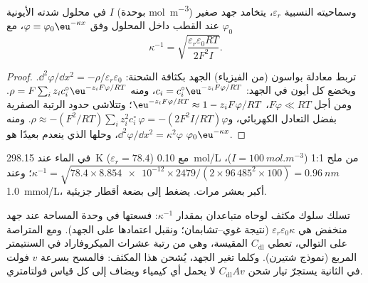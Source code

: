 \begin{proposition}\label{prop:b3:electrode-kinetics:debye-length}
في محلول شدته الأيونية $I$ (بوحدة \unit{mol.m^{-3}}) وسماحيته النسبية
$\varepsilon_r$، يتخامد جهد صغير $\varphi_0$ عند القطب داخل المحلول وفق
$\varphi = \varphi_0\eu^{-\kappa x}$، مع
\[
  \kappa^{-1} = \sqrt{\frac{\varepsilon_r\varepsilon_0RT}{2F^2I}} .
\]
\end{proposition}

\begin{proof}
تربط معادلة بواسون (من الفيزياء) الجهد بكثافة الشحنة:
$\dd^2\varphi/\dd x^2 = -\rho/\varepsilon_r\varepsilon_0$. ويخضع كل أيون  في
الجهد: $c_i = c_i^{\circ}\eu^{-z_iF\varphi/RT}$، ومنه $\rho = F\sum_iz_ic_i^{\circ}\eu^{-z_iF\varphi/RT}$. ومن أجل $F\varphi \ll RT$،
$\eu^{-z_iF\varphi/RT} \approx 1 - z_iF\varphi/RT$؛ وتتلاشى حدود الرتبة الصفرية بفضل التعادل الكهربائي،
و$\rho \approx -(F^2/RT)\sum_iz_i^2c_i^{\circ}\,\varphi = -(2F^2I/RT)\varphi$. ومنه $\dd^2\varphi/\dd x^2 = \kappa^2\varphi$، 
وحلها الذي ينعدم بعيدًا هو $\varphi_0\eu^{-\kappa x}$.
\end{proof}

\begin{example}\label{ex:b3:electrode-kinetics:debye}
في الماء عند \qty{298.15}{K} ($\varepsilon_r = 78.4$) مع \qty{0.10}{mol/L} من ملح 1:1 ($I = \qty{100}{mol.m^{-3}}$)،
$\kappa^{-1} = \sqrt{78.4 \times \num{8.854e-12} \times 2479/(2 \times 96\,485^2 \times 100)} = \qty{0.96}{nm}$؛ وعند \qty{1.0}{mmol/L}،
أكبر بعشر مرات.  يضغط  إلى بضعة
أقطار جزيئية.
\end{example}

تسلك  سلوك مكثف لوحاه متباعدان بمقدار $\kappa^{-1}$: فسعتها
في وحدة المساحة عند جهد منخفض هي $\varepsilon_r\varepsilon_0\kappa$ (نتيجة غوي--تشابمان؛
ونقبل اعتمادها على الجهد). ومع  المتراصة على التوالي، تعطي
$C_{\mathrm{dl}}$ المقيسة، وهي من رتبة عشرات
الميكروفاراد في السنتيمتر المربع (نموذج شتيرن). وكلما تغير الجهد، يُشحن
هذا المكثف: فالمسح بسرعة $v$ فولت في الثانية يستجرّ تيار شحن $C_{\mathrm{dl}}Av$
لا يحمل أي كيمياء ويضاف إلى كل قياس فولتامتري.

